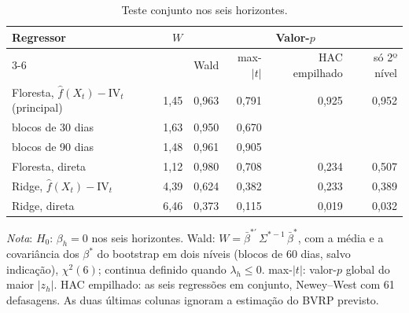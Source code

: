 \begin{table}[H]
\centering
\footnotesize
\caption{Teste conjunto nos seis horizontes.}
\label{tab:retnl-conjunto}
\begin{tabular}{lrrrrr}
\toprule
Regressor & $W$ & \multicolumn{4}{c}{Valor-$p$} \\ \cmidrule(lr){3-6}
 & & Wald & max-$|t|$ & HAC empilhado & só 2º nível \\
\midrule
Floresta, $\hat f(X_t) - \text{IV}_t$ (principal) & 1{,}45 & 0{,}963 & 0{,}791 & 0{,}925 & 0{,}952 \\
\quad blocos de 30 dias & 1{,}63 & 0{,}950 & 0{,}670 & & \\
\quad blocos de 90 dias & 1{,}48 & 0{,}961 & 0{,}905 & & \\
Floresta, direta & 1{,}12 & 0{,}980 & 0{,}708 & 0{,}234 & 0{,}507 \\
Ridge, $\hat f(X_t) - \text{IV}_t$ & 4{,}39 & 0{,}624 & 0{,}382 & 0{,}233 & 0{,}389 \\
Ridge, direta & 6{,}46 & 0{,}373 & 0{,}115 & 0{,}019 & 0{,}032 \\
\bottomrule
\end{tabular}
\par\smallskip
\parbox{0.95\linewidth}{\footnotesize\textit{Nota}: $H_0$: $\beta_h = 0$ nos seis horizontes. Wald: $W = \bar\beta^{*\prime}\,\Sigma^{*-1}\,\bar\beta^*$, com a média e a covariância dos $\beta^*$ do bootstrap em dois níveis (blocos de 60 dias, salvo indicação), $\chi^2(6)$; continua definido quando $\lambda_h \le 0$. max-$|t|$: valor-$p$ global do maior $|z_h|$. HAC empilhado: as seis regressões em conjunto, Newey--West com 61 defasagens. As duas últimas colunas ignoram a estimação do BVRP previsto.}
\end{table}
